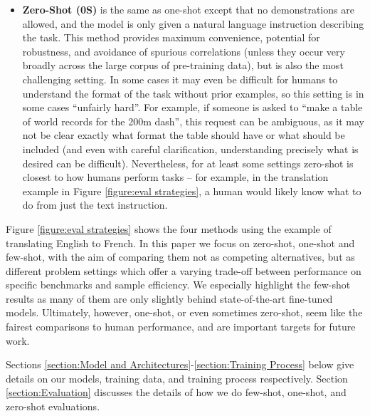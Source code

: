 \documentclass{article}
\begin{document}
\begin{itemize}
    \item \textbf{Zero-Shot (0S)} is the same as one-shot except that no demonstrations are allowed, and the model is only given a natural language instruction describing the task.  This method provides maximum convenience, potential for robustness, and avoidance of spurious correlations (unless they occur very broadly across the large corpus of  pre-training data), but is also the most challenging setting.  In some cases it may even be difficult for humans to understand the format of the task without prior examples, so this setting is in some cases ``unfairly hard''.  For example, if someone is asked to ``make a table of world records for the 200m dash'', this request can be ambiguous, as it may not be clear exactly what format the table should have or what should be included (and even with careful clarification, understanding precisely what is desired can be difficult).  Nevertheless, for at least some settings zero-shot is closest to how humans perform tasks -- for example, in the translation example in Figure \ref{figure:eval strategies}, a human would likely know what to do from just the text instruction.
\end{itemize}


Figure \ref{figure:eval strategies} shows the four methods using the example of translating English to French.  In this paper we focus on zero-shot, one-shot and few-shot, with the aim of comparing them not as competing alternatives, but as different problem settings which offer a varying trade-off between performance on specific benchmarks and sample efficiency.  We especially highlight the few-shot results as many of them are only slightly behind state-of-the-art fine-tuned models.  Ultimately, however, one-shot, or even sometimes zero-shot, seem like the fairest comparisons to human performance, and are important targets for future work.

Sections \ref{section:Model and Architectures}-\ref{section:Training Process} below give details on our models, training data, and training process respectively.  
Section \ref{section:Evaluation} discusses the details of how we do few-shot, one-shot, and zero-shot evaluations.
 
\end{document}
